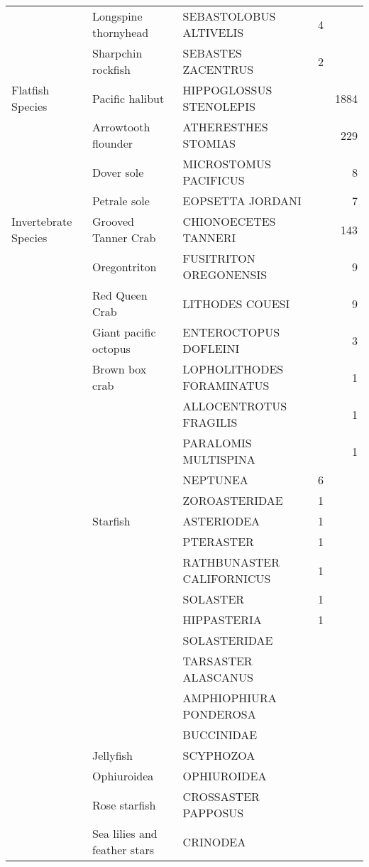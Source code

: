 \documentclass[12pt]{article}\usepackage[]{graphicx}\usepackage[]{color}
\begin{document}
\begin{table}
\begin{tabular}[t]{lllrr}
 & Longspine thornyhead & SEBASTOLOBUS ALTIVELIS & 4 & \\
 & Sharpchin rockfish & SEBASTES ZACENTRUS & 2 & \\
\hline
Flatfish Species & Pacific halibut & HIPPOGLOSSUS STENOLEPIS &  & 1884\\
 & Arrowtooth flounder & ATHERESTHES STOMIAS &  & 229\\
 & Dover sole & MICROSTOMUS PACIFICUS &  & 8\\
 & Petrale sole & EOPSETTA JORDANI &  & 7\\
\hline
Invertebrate Species & Grooved Tanner Crab & CHIONOECETES TANNERI &  & 143\\
 & Oregontriton & FUSITRITON OREGONENSIS &  & 9\\
 & Red Queen Crab & LITHODES COUESI &  & 9\\
 & Giant pacific octopus & ENTEROCTOPUS DOFLEINI &  & 3\\
 & Brown box crab & LOPHOLITHODES FORAMINATUS &  & 1\\
 &  & ALLOCENTROTUS FRAGILIS &  & 1\\
 &  & PARALOMIS MULTISPINA &  & 1\\
 &  & NEPTUNEA & 6 & \\
 &  & ZOROASTERIDAE & 1 & \\
 & Starfish & ASTERIODEA & 1 & \\
 &  & PTERASTER & 1 & \\
 &  & RATHBUNASTER CALIFORNICUS & 1 & \\
 &  & SOLASTER & 1 & \\
 &  & HIPPASTERIA & 1 & \\
 &  & SOLASTERIDAE &  & \\
 &  & TARSASTER ALASCANUS &  & \\
 &  & AMPHIOPHIURA PONDEROSA &  & \\
 &  & BUCCINIDAE &  & \\
 & Jellyfish & SCYPHOZOA &  & \\
 & Ophiuroidea & OPHIUROIDEA &  & \\
 & Rose starfish & CROSSASTER PAPPOSUS &  & \\
 & Sea lilies and feather stars & CRINODEA &  & \\
\bottomrule
\end{tabular}
\end{table}
\end{document}
